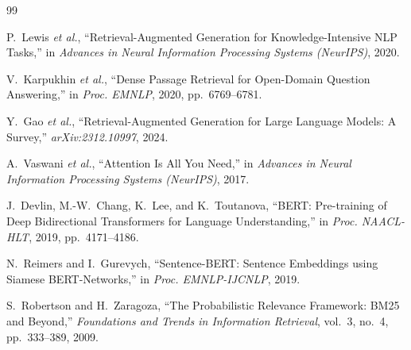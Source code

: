 \begin{frame}[allowframebreaks]{}
  \begin{PTltr}
    \scriptsize
    \begin{thebibliography}{99}

      P.~Lewis \textit{et al.}, ``Retrieval-Augmented Generation for
      Knowledge-Intensive NLP Tasks,'' in \textit{Advances in Neural Information
      Processing Systems (NeurIPS)}, 2020.

      V.~Karpukhin \textit{et al.}, ``Dense Passage Retrieval for Open-Domain
      Question Answering,'' in \textit{Proc. EMNLP}, 2020, pp.~6769--6781.

      Y.~Gao \textit{et al.}, ``Retrieval-Augmented Generation for Large Language
      Models: A Survey,'' \textit{arXiv:2312.10997}, 2024.

      A.~Vaswani \textit{et al.}, ``Attention Is All You Need,'' in
      \textit{Advances in Neural Information Processing Systems (NeurIPS)}, 2017.

      J.~Devlin, M.-W.~Chang, K.~Lee, and K.~Toutanova, ``BERT: Pre-training of
      Deep Bidirectional Transformers for Language Understanding,'' in
      \textit{Proc. NAACL-HLT}, 2019, pp.~4171--4186.

      N.~Reimers and I.~Gurevych, ``Sentence-BERT: Sentence Embeddings using
      Siamese BERT-Networks,'' in \textit{Proc. EMNLP-IJCNLP}, 2019.

      S.~Robertson and H.~Zaragoza, ``The Probabilistic Relevance Framework:
      BM25 and Beyond,'' \textit{Foundations and Trends in Information
      Retrieval}, vol.~3, no.~4, pp.~333--389, 2009.


\end{thebibliography}
\end{PTltr}
\end{frame}
